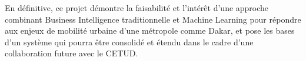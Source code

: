 En définitive, ce projet démontre la faisabilité et l'intérêt d'une approche combinant Business Intelligence traditionnelle et Machine Learning pour répondre aux enjeux de mobilité urbaine d'une métropole comme Dakar, et pose les bases d'un système qui pourra être consolidé et étendu dans le cadre d'une collaboration future avec le CETUD.

\clearpage
